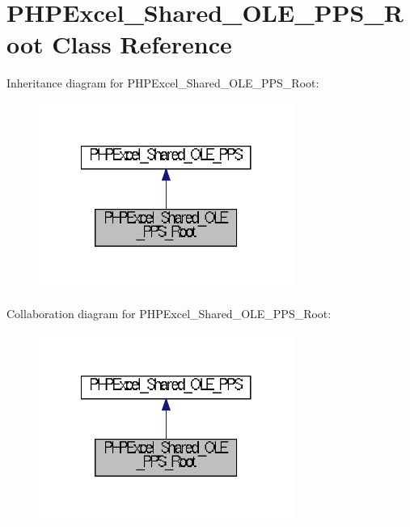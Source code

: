 \section{P\+H\+P\+Excel\+\_\+\+Shared\+\_\+\+O\+L\+E\+\_\+\+P\+P\+S\+\_\+\+Root Class Reference}
\label{class_p_h_p_excel___shared___o_l_e___p_p_s___root}


Inheritance diagram for P\+H\+P\+Excel\+\_\+\+Shared\+\_\+\+O\+L\+E\+\_\+\+P\+P\+S\+\_\+\+Root\+:\nopagebreak
\begin{figure}[H]
\begin{center}
\leavevmode
\includegraphics[width=236pt]{class_p_h_p_excel___shared___o_l_e___p_p_s___root__inherit__graph}
\end{center}
\end{figure}


Collaboration diagram for P\+H\+P\+Excel\+\_\+\+Shared\+\_\+\+O\+L\+E\+\_\+\+P\+P\+S\+\_\+\+Root\+:\nopagebreak
\begin{figure}[H]
\begin{center}
\leavevmode
\includegraphics[width=236pt]{class_p_h_p_excel___shared___o_l_e___p_p_s___root__coll__graph}
\end{center}
\end{figure}
